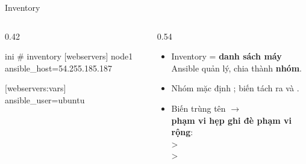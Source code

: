 \documentclass[aspectratio=169,11pt,xcolor=table]{beamer}
\begin{document}
\begin{frame}[fragile]{Inventory}
  \begin{columns}[c]
    \begin{column}{0.42\textwidth}
\begin{codeblock}{ini}
# inventory
[webservers]
node1 ansible_host=54.255.185.187

[webservers:vars]
ansible_user=ubuntu
\end{codeblock}
    \end{column}
    \begin{column}{0.54\textwidth}
      \begin{itemize}\setlength{\itemsep}{0.3cm}
        \item Inventory = \textbf{danh sách máy} Ansible quản lý, chia thành \textbf{nhóm}.
        \item Nhóm mặc định ; biến tách ra  và .
        \item Biến trùng tên $\rightarrow$\\ \textbf{phạm vi hẹp ghi đè phạm vi rộng}:\\
               > \\ > 
      \end{itemize}
    \end{column}
  \end{columns}
\end{frame}
\end{document}
